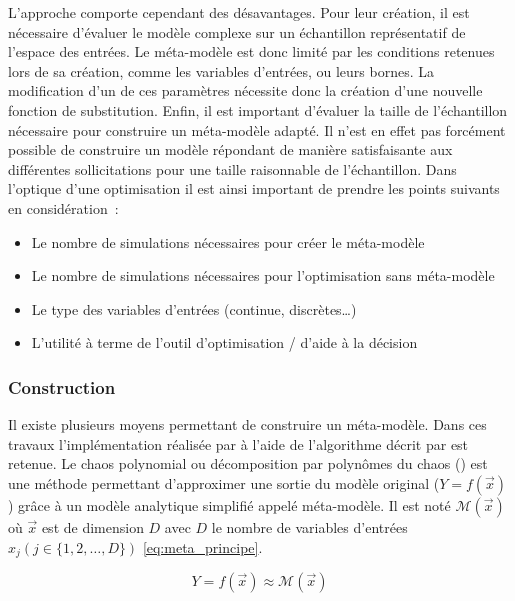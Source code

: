 L’approche comporte cependant des désavantages. Pour leur création, il est nécessaire
d’évaluer le modèle complexe sur un échantillon représentatif de l’espace des entrées.
Le méta-modèle est donc limité par les conditions retenues lors de sa création, comme
les variables d’entrées, ou leurs bornes. La modification d’un de ces paramètres nécessite
donc la création d’une nouvelle fonction de substitution.
Enfin, il est important d’évaluer la taille de l’échantillon nécessaire pour construire
un méta-modèle adapté. Il n’est en effet pas forcément possible de construire un modèle
répondant de manière satisfaisante aux différentes sollicitations pour une taille raisonnable
de l’échantillon.
Dans l’optique d’une optimisation il est ainsi important de prendre les points
suivants en considération~:
\begin{itemize}
  \item Le nombre de simulations nécessaires pour créer le méta-modèle
  \item Le nombre de simulations nécessaires pour l’optimisation sans méta-modèle
  \item Le type des variables d’entrées (continue, discrètes\dots)
  \item L’utilité à terme de l’outil d’optimisation / d’aide à la décision
\end{itemize}


\subsubsection{Construction} %
\label{ssub:construction}
Il existe plusieurs moyens permettant de construire un méta-modèle. Dans ces travaux
l’implémentation réalisée par \textcite{Merheb2013} à l’aide de l’algorithme décrit par
\textcite{Malen2009} est retenue. Le chaos polynomial ou décomposition par polynômes du
chaos () est une méthode permettant d’approximer une sortie du modèle original
($Y = f(\vec{x})$) grâce à un modèle analytique simplifié appelé méta-modèle. Il est noté
$\mathcal{M}(\vec{x})$ où $\vec{x}$ est de dimension $D$ avec $D$ le nombre de variables d’entrées
$x_{j} (j \in \{1, 2, \dotsc, D\})$ \eqref{eq:meta_principe}.

\begin{equation}\label{eq:meta_principe}
  Y = f(\vec{x}) \approx \mathcal{M}(\vec{x})
\end{equation}

